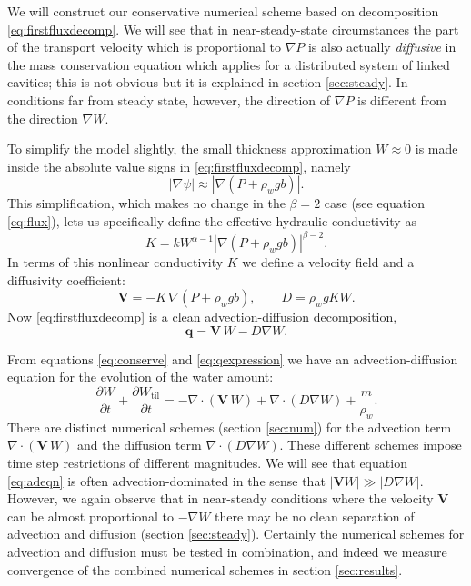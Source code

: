 \documentclass[gmd]{copernicus}   %
\newcommand{\text}{\textrm}
\newcommand\bV{\mathbf{V}}
\newcommand\bq{\mathbf{q}}
\newcommand{\Div}{\nabla\cdot}
\newcommand{\grad}{\nabla}
\newcommand{\Wtil}{W_{\text{til}}}
\begin{document}
We will construct our conservative numerical scheme based on decomposition \eqref{eq:firstfluxdecomp}.  We will see that in near-steady-state circumstances the part of the transport velocity which is proportional to $\grad P$ is also actually \emph{diffusive} in the mass conservation equation which applies for a distributed system of linked cavities; this is not obvious but it is explained in section \ref{sec:steady}.  In conditions far from steady state, however, the direction of $\grad P$ is different from the direction $\grad W$.

To simplify the model slightly, the small thickness approximation $W\approx 0$ is made inside the absolute value signs in \eqref{eq:firstfluxdecomp}, namely
\begin{equation}
\left|\grad \psi\right| \approx \left|\grad \left(P + \rho_w g b \right)\right|.  \label{eq:Wsmall}
\end{equation}
This simplification, which makes no change in the $\beta=2$ case (see equation \eqref{eq:flux}), lets us specifically define the effective hydraulic conductivity as
\begin{equation}
K = k W^{\alpha-1} \left|\grad(P+\rho_w g b)\right|^{\beta - 2}. \label{eq:Kdefine}
\end{equation}
In terms of this nonlinear conductivity $K$ we define a velocity field and a diffusivity coefficient:
\begin{equation} \label{eq:vexpression}
  \bV = - K\, \grad \left(P + \rho_w g b\right), \qquad D = \rho_w g K W.
\end{equation}
Now \eqref{eq:firstfluxdecomp} is a clean advection-diffusion decomposition,
\begin{equation} \label{eq:qexpression}
  \bq = \bV\, W - D \grad W.
\end{equation}

From equations \eqref{eq:conserve} and \eqref{eq:qexpression} we have an advection-diffusion equation \citep{HundsdorferVerwer2010} for the evolution of the water amount:
\begin{equation} \label{eq:adeqn}
  \frac{\partial W}{\partial t} + \frac{\partial \Wtil}{\partial t} = - \Div\left(\bV\, W\right) + \Div \left(D \grad W\right) + \frac{m}{\rho_w}.
\end{equation}
There are distinct numerical schemes (section \ref{sec:num}) for the advection term $\Div\left(\bV\, W\right)$ and the diffusion term $\Div \left(D \grad W\right)$.  These different schemes impose time step restrictions of different magnitudes.  We will see that equation \eqref{eq:adeqn} is often advection-dominated in the sense that $|\bV W| \gg |D \grad W|$.  However, we again observe that in near-steady conditions where the velocity $\bV$ can be almost proportional to $-\grad W$ there may be no clean separation of advection and diffusion (section \ref{sec:steady}).  Certainly the numerical schemes for advection and diffusion must be tested in combination, and indeed we measure convergence of the combined numerical schemes in section \ref{sec:results}.
\end{document}
